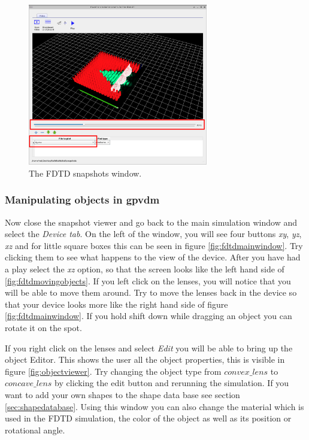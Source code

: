 \begin{figure}[H]
\centering
\includegraphics[width=0.7\textwidth]{./images/fdtd_9.png}
\caption{The FDTD snapshots window.}
\label{fig:fdtdsnapshots}
\end{figure}

\subsubsection{Manipulating objects in gpvdm}
Now close the snapshot viewer and go back to the main simulation window and select the \emph{Device tab}.  On the left of the window, you will see four buttons \emph{xy}, \emph{yz}, \emph{xz} and for little square boxes this can be seen in figure \ref{fig:fdtdmainwindow}. Try clicking them to see what happens to the view of the device.  After you have had a play select the \emph{xz} option, so that the screen looks like the left hand side of \ref{fig:fdtdmovingobjects}.  If you left click on the lenses, you will notice that you will be able to move them around. Try to move the lenses back in the device so that your device looks more like the right hand side of figure \ref{fig:fdtdmainwindow}.  If you hold shift down while dragging an object you can rotate it on the spot.

If you right click on the lenses and select \emph{Edit} you will be able to bring up the object Editor.  This shows the user all the object properties, this is visible in figure \ref{fig:objectviewer}. Try changing the object type from $convex\_lens$ to $concave\_ lens$ by clicking the edit button and rerunning the simulation.  If you want to add your own shapes to the shape data base see section \ref{sec:shapedatabase}. Using this window you can also change the material which is used in the FDTD simulation, the color of the object as well as its position or rotational angle.

